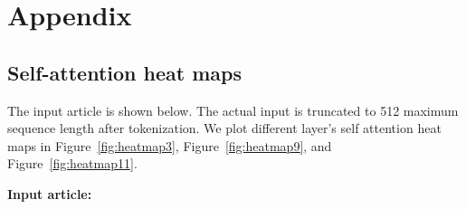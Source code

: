 \documentclass[letterpaper]{article}
\begin{document}

\clearpage

\onecolumn
\newpage
\appendix
\section{Appendix}
\subsection{Self-attention heat maps}
\label{appendix:heatmap}
The input article is shown below. 
The actual input is truncated to 512 maximum sequence length after tokenization.
We plot different layer's self attention heat maps in Figure~\ref{fig:heatmap3}, Figure~\ref{fig:heatmap9}, and Figure~\ref{fig:heatmap11}. 

\smallskip \noindent \textbf{Input article:}\\
\end{document}

